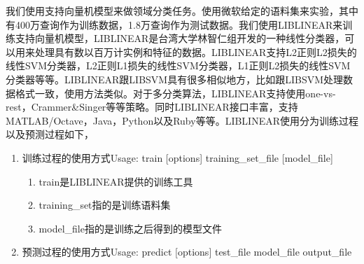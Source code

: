 \documentclass[master]{njuthesis}
\begin{document}
    我们使用支持向量机模型来做领域分类任务。使用微软给定的语料集来实验，其中有400万查询作为训练数据，1.8万查询作为测试数据。我们使用LIBLINEAR来训练支持向量机模型，LIBLINEAR是台湾大学林智仁组开发的一种线性分类器，可以用来处理具有数以百万计实例和特征的数据。LIBLINEAR支持L2正则L2损失的线性SVM分类器，L2正则L1损失的线性SVM分类器，L1正则L2损失的线性SVM分类器等等。LIBLINEAR跟LIBSVM具有很多相似地方，比如跟LIBSVM处理数据格式一致，使用方法类似。对于多分类算法，LIBLINEAR支持使用one-vs-rest，Crammer\&Singer等等策略。同时LIBLINEAR接口丰富，支持MATLAB/Octave，Java，Python以及Ruby等等。LIBLINEAR使用分为训练过程以及预测过程如下，
\begin{enumerate}
    \item 训练过程的使用方式Usage: train [options] training\_set\_file [model\_file]
     \begin{enumerate}
       \item train是LIBLINEAR提供的训练工具
       \item training\_set指的是训练语料集
       \item model\_file指的是训练之后得到的模型文件
     \end{enumerate}
    \item 预测过程的使用方式Usage: predict [options] test\_file model\_file output\_file
    

\end{enumerate}
\end{document}
